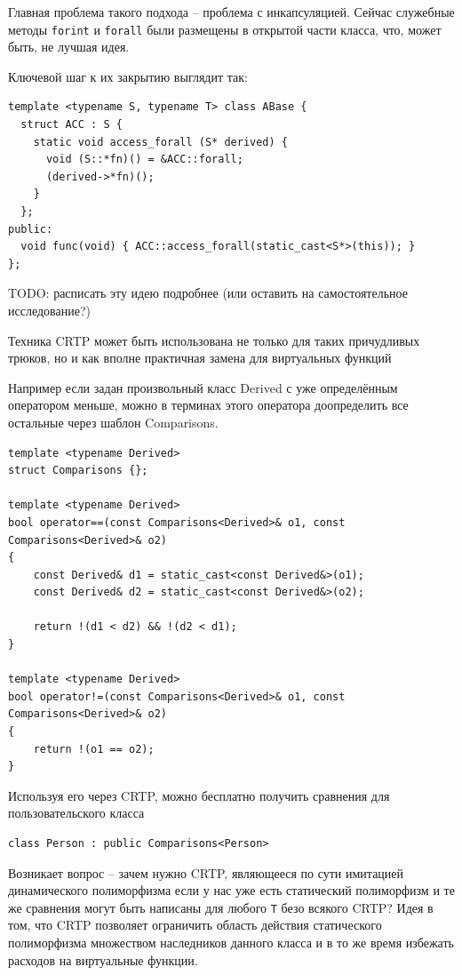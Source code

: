 \documentclass[a4paper,12pt,oneside]{article}
\begin{document}
Главная проблема такого подхода -- проблема с инкапсуляцией. Сейчас служебные методы \lstinline!forint! и \lstinline!forall! были размещены в открытой части класса, что, может быть, не лучшая идея.

Ключевой шаг к их закрытию выглядит так:

\begin{lstlisting}
template <typename S, typename T> class ABase {
  struct ACC : S { 
    static void access_forall (S* derived) { 
      void (S::*fn)() = &ACC::forall;
      (derived->*fn)(); 
    }
  };
public:
  void func(void) { ACC::access_forall(static_cast<S*>(this)); }
};
\end{lstlisting}

TODO: расписать эту идею подробнее (или оставить на самостоятельное исследование?)

Техника CRTP может быть использована не только для таких причудливых трюков, но и как вполне практичная замена для виртуальных функций

Например если задан произвольный класс Derived с уже определённым оператором меньше, можно в терминах этого оператора доопределить все остальные через шаблон Comparisons. 

\begin{lstlisting}
template <typename Derived>
struct Comparisons {};

template <typename Derived>
bool operator==(const Comparisons<Derived>& o1, const Comparisons<Derived>& o2)
{
    const Derived& d1 = static_cast<const Derived&>(o1);
    const Derived& d2 = static_cast<const Derived&>(o2);

    return !(d1 < d2) && !(d2 < d1);
}

template <typename Derived>
bool operator!=(const Comparisons<Derived>& o1, const Comparisons<Derived>& o2)
{
    return !(o1 == o2);
}
\end{lstlisting}

Используя его через CRTP, можно бесплатно получить сравнения для пользовательского класса

\begin{lstlisting}
class Person : public Comparisons<Person>
\end{lstlisting}

Возникает вопрос -- зачем нужно CRTP, являющееся по сути имитацией динамического полиморфизма если у нас уже есть статический полиморфизм и те же сравнения могут быть написаны для любого \lstinline!T! безо всякого CRTP? Идея в том, что CRTP позволяет ограничить область действия статического полиморфизма множеством наследников данного класса и в то же время избежать расходов на виртуальные функции.
\end{document}
